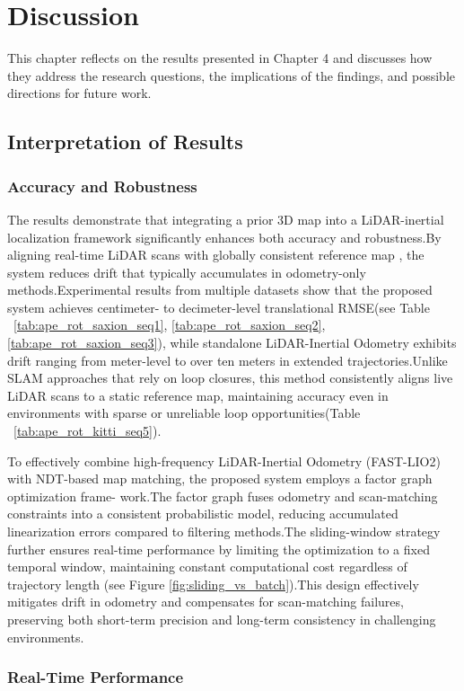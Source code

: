\chapter{Discussion}
\label{ch:discu}
This chapter reflects on the results presented in Chapter 4 and discusses how they address
the research questions, the implications of the findings, and possible directions for future
work.
\section{Interpretation of Results}
\subsection{Accuracy and Robustness  }
The results demonstrate that integrating a prior 3D map into a LiDAR-inertial localization framework significantly enhances both accuracy and robustness.By aligning real-time LiDAR scans with globally consistent reference  map , the system reduces drift that typically accumulates in odometry-only methods.Experimental results from multiple datasets show that the proposed system achieves centimeter- to decimeter-level translational RMSE(see  Table ~\ref{tab:ape_rot_saxion_seq1}, \ref{tab:ape_rot_saxion_seq2},  \ref{tab:ape_rot_saxion_seq3}), while standalone LiDAR-Inertial Odometry exhibits drift ranging from meter-level to over ten meters in extended trajectories.Unlike SLAM approaches that rely on loop closures, this method consistently aligns live LiDAR scans to a static reference map, maintaining accuracy even in environments with sparse or unreliable loop opportunities(Table ~\ref{tab:ape_rot_kitti_seq5}).

To effectively combine high-frequency LiDAR-Inertial Odometry (FAST-LIO2) with
NDT-based map matching, the proposed system employs a factor graph optimization frame-
work.The factor graph fuses odometry and scan-matching constraints into a consistent probabilistic model, reducing accumulated linearization errors compared to filtering methods.The sliding-window strategy further ensures real-time performance by limiting the optimization to a fixed temporal window, maintaining constant computational cost regardless of trajectory length (see Figure \ref{fig:sliding_vs_batch}).This
design effectively mitigates drift in odometry and compensates for scan-matching failures,
preserving both short-term precision and long-term consistency in challenging environments.

\subsection{Real-Time Performance }

